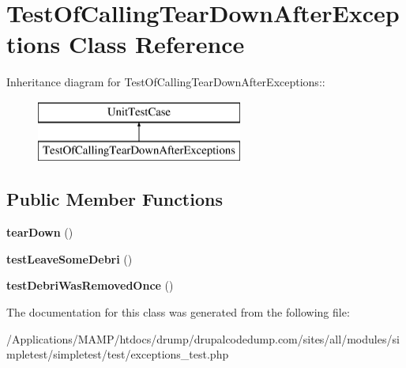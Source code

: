 \hypertarget{class_test_of_calling_tear_down_after_exceptions}{
\section{TestOfCallingTearDownAfterExceptions Class Reference}
\label{class_test_of_calling_tear_down_after_exceptions}
}
Inheritance diagram for TestOfCallingTearDownAfterExceptions::\begin{figure}[H]
\begin{center}
\leavevmode
\includegraphics[height=2cm]{class_test_of_calling_tear_down_after_exceptions}
\end{center}
\end{figure}
\subsection*{Public Member Functions}
\begin{DoxyCompactItemize}
\item 
\hypertarget{class_test_of_calling_tear_down_after_exceptions_a82e624c5ec82884754ebef1e0f94e3cb}{
{\bfseries tearDown} ()}
\label{class_test_of_calling_tear_down_after_exceptions_a82e624c5ec82884754ebef1e0f94e3cb}

\item 
\hypertarget{class_test_of_calling_tear_down_after_exceptions_a38e70189da1c06941fe89401219eb648}{
{\bfseries testLeaveSomeDebri} ()}
\label{class_test_of_calling_tear_down_after_exceptions_a38e70189da1c06941fe89401219eb648}

\item 
\hypertarget{class_test_of_calling_tear_down_after_exceptions_ae2c1b5029f5cdaabae843890778d6ff6}{
{\bfseries testDebriWasRemovedOnce} ()}
\label{class_test_of_calling_tear_down_after_exceptions_ae2c1b5029f5cdaabae843890778d6ff6}

\end{DoxyCompactItemize}


The documentation for this class was generated from the following file:\begin{DoxyCompactItemize}
\item 
/Applications/MAMP/htdocs/drump/drupalcodedump.com/sites/all/modules/simpletest/simpletest/test/exceptions\_\-test.php\end{DoxyCompactItemize}
